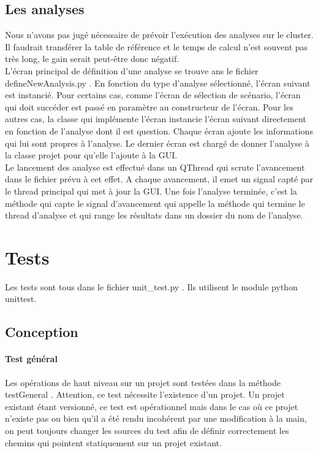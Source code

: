 \documentclass[12pt,a4paper]{article}
\begin{document}
    \subsection{Les analyses}
        Nous n'avons pas jugé nécessaire de prévoir l'exécution des analyses sur
        le cluster. Il faudrait transférer la table de référence et le temps de
        calcul n'est souvent pas très long, le gain serait peut-être donc
        négatif.\\

        L'écran principal de définition d'une analyse se trouve ans le fichier
        defineNewAnalysis.py . En fonction du type d'analyse sélectionné,
        l'écran suivant est instancié. Pour certains cas, comme l'écran de
        sélection de scénario, l'écran qui doit succéder est passé en paramètre
        au constructeur de l'écran. Pour les autres cas, la classe qui
        implémente l'écran instancie l'écran suivant directement en fonction de
        l'analyse dont il est question. Chaque écran ajoute les informations qui
        lui sont propres à l'analyse. Le dernier écran est chargé de donner
        l'analyse à la classe projet pour qu'elle l'ajoute à la GUI.\\

        Le lancement des analyse est effectué dans un QThread qui scrute
        l'avancement dans le fichier prévu à cet effet. A chaque avancement, il
        emet un signal capté par le thread principal qui met à jour la GUI. Une
        fois l'analyse terminée, c'est la méthode qui capte le signal
        d'avancement qui appelle la méthode qui termine le thread d'analyse et
        qui range les résultats dans un dossier du nom de l'analyse.


\section{Tests}
    Les tests sont tous dans le fichier unit\_test.py . Ils utilisent le module
    python unittest.
    \subsection{Conception}
    \paragraph{Test général}
    Les opérations de haut niveau sur un projet sont testées dans la méthode
    testGeneral . Attention, ce test nécessite l'existence d'un projet. 
    Un projet existant étant versionné, ce test est opérationnel mais dans le
    cas où ce projet n'existe pas ou bien qu'il a été rendu incohérent par une
    modification à la main, on peut toujours changer les sources du test afin de
    définir correctement les chemins qui pointent statiquement sur un projet
    existant.
\end{document}
